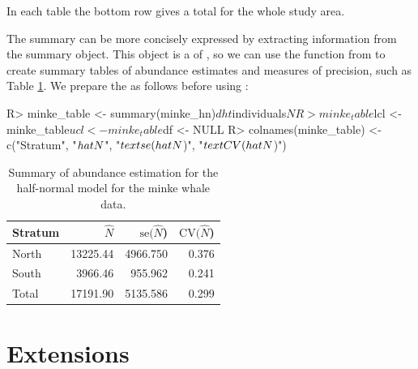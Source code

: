 \documentclass[article,shortnames]{jss}
\begin{document}
In each table the bottom row gives a total for the whole study area.

The summary can be more concisely expressed by extracting information
from the summary object. This object is a  of
, so we can use the  function from
 to create summary tables of abundance estimates and measures
of precision, such as Table \ref{minke-abund}. We prepare the
 as follows before using :

\begin{CodeChunk}
\begin{CodeInput}
R> minke_table <- summary(minke_hn)$dht$individuals$N
R> minke_table$lcl <- minke_table$ucl <- minke_table$df <- NULL
R> colnames(minke_table) <- c("Stratum", "$\\hat{N}$", "$\\text{se}(\\hat{N}$)", 
                           "$\\text{CV}(\\hat{N}$)")
\end{CodeInput}
\end{CodeChunk}

\begin{CodeChunk}
\begin{table}

\centering
\begin{tabular}[t]{lrrr}
\toprule
Stratum & $\hat{N}$ & $\text{se}(\hat{N}$) & $\text{CV}(\hat{N}$)\\
\midrule
North & 13225.44 & 4966.750 & 0.376\\
South & 3966.46 & 955.962 & 0.241\\
Total & 17191.90 & 5135.586 & 0.299\\
\bottomrule
\end{tabular}
\caption{Summary of abundance estimation for the half-normal model for the minke whale data.\label{minke-abund}}
\end{table}

\end{CodeChunk}

\section{Extensions}\label{extensions}
\end{document}
